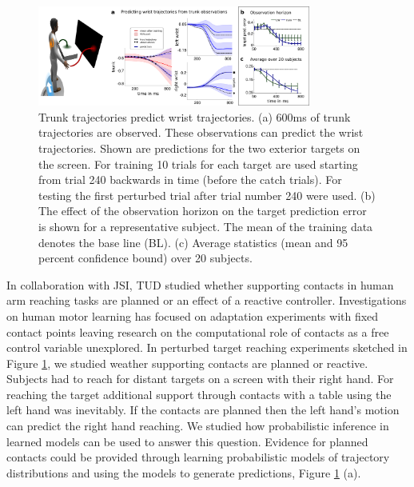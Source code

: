 
\begin{figure}
\centering
\includegraphics[width=0.8\textwidth]{./sections/WP2/pics_TUD/SummaryFig_Y2Report}
 \caption{Trunk trajectories predict wrist trajectories.  
 (a) 600ms of trunk trajectories are observed. These observations can predict the wrist trajectories. Shown are predictions for the two exterior targets on the screen. 
 For training 10 trials for each target are used starting from trial 240 backwards in time (before the catch trials). For testing the first perturbed trial after trial number 240 were used. 
 (b) The effect of the observation horizon on the target prediction error is shown for a representative subject. The mean of the training data denotes the base line (BL). (c) Average statistics (mean and 95 percent confidence bound) over 20 subjects.
}
\label{fig:HumanProMPsPrediction}
\end{figure}
In collaboration with JSI, TUD studied whether supporting contacts
in human arm reaching tasks are planned or an effect of a reactive controller. 
Investigations on human motor learning has focused on adaptation experiments with fixed contact points leaving 
research on the computational role of contacts as a free control variable unexplored. 
In perturbed target reaching experiments sketched in Figure \ref{fig:HumanProMPsPrediction}, we studied weather supporting contacts are planned or reactive. 
Subjects had to reach for distant targets on a screen with their right hand. 
For reaching the target additional support through contacts with a table using the left hand was inevitably. 
If the contacts are planned then the left hand's motion can predict the right hand reaching. 
We studied how probabilistic inference in learned models can be used to answer this question. 
Evidence for planned contacts could be provided through learning probabilistic models of trajectory distributions and using the models to generate predictions, Figure \ref{fig:HumanProMPsPrediction} (a). 
